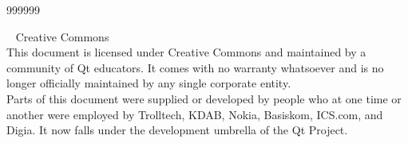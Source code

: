   \begin{slide}{999999}
  \begin{center}
    \vspace{1em}
    \textcopyright~ Creative Commons\\
    \vspace{.5em}
    This document is licensed under Creative Commons and maintained by
    a community of Qt educators. It comes with no warranty whatsoever
    and is no longer officially maintained by any single corporate
    entity. \\
    Parts of this document were supplied or developed by people who at
    one time or another were employed by Trolltech, KDAB, Nokia,
    Basiskom, ICS.com, and Digia. It now falls under the development 
    umbrella of the Qt Project. \\
    \end{center}
  \end{slide}

